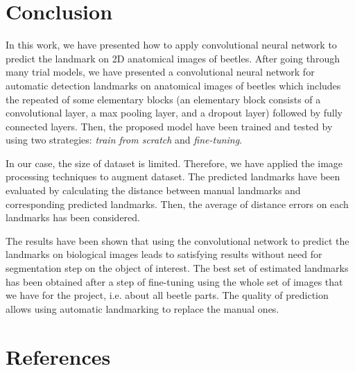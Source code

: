 \documentclass[review]{elsarticle}
\begin{document}
\pagebreak
\section{Conclusion}
\label{sconclusion}
In this work, we have presented how to apply convolutional neural network to predict the landmark on 2D anatomical images of beetles. After going through many trial models, we have presented a convolutional neural network for automatic detection landmarks on anatomical images of beetles which includes the repeated of some elementary blocks (an elementary block consists of a convolutional layer, a max pooling layer, and a dropout layer) followed by fully connected layers. Then, the proposed model have been trained and tested by using two strategies: \textit{train from scratch} and \textit{fine-tuning}. 

In our case, the size of dataset is limited. Therefore, we have applied the image processing techniques to augment dataset. The predicted landmarks have been evaluated by calculating the distance between manual landmarks and corresponding predicted landmarks. Then, the average of distance errors on each landmarks has been considered.

The results have been shown that using the convolutional network to predict the landmarks on biological images leads to satisfying results without need for segmentation step on the object of interest. The
best set of estimated landmarks has been obtained after a step
of fine-tuning using the whole set of images that we have for the
project, i.e. about all beetle parts. The quality of prediction allows using automatic landmarking to replace the manual ones.
\section*{References}


\end{document}
